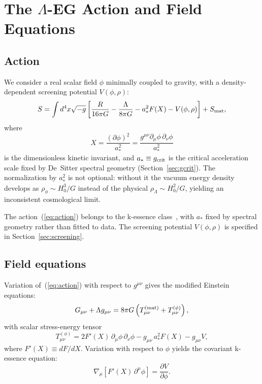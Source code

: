 \documentclass[11pt,a4paper]{article}
\begin{document}
\section{The \texorpdfstring{$\Lambda$}{Lambda}-EG Action and Field Equations}
\label{sec:action}

\subsection{Action}
\label{subsec:action}

We consider a real scalar field $\phi$ minimally coupled to gravity, with a
density-dependent screening potential $V(\phi,\rho)$:
\begin{equation}
  S = \int d^4x\sqrt{-g}\left[\frac{R}{16\pi G} - \frac{\Lambda}{8\pi G}
  - a_*^2 F(X) - V(\phi,\rho)\right] + S_{\rm mat},
  \label{eq:action}
\end{equation}
where
\begin{equation}
  X = \frac{(\partial\phi)^2}{a_*^2} = \frac{g^{\mu\nu}\partial_\mu\phi\,\partial_\nu\phi}{a_*^2}
\end{equation}
is the dimensionless kinetic invariant, and $a_* \equiv g_{\rm crit}$ is the critical
acceleration scale fixed by De~Sitter spectral geometry (Section~\ref{sec:gcrit}).
The normalization by $a_*^2$ is not optional: without it the vacuum energy density
develops as $\rho_\phi\sim H_0^3/G$ instead of the physical $\rho_\Lambda\sim H_0^2/G$,
yielding an inconsistent cosmological limit.

The action~(\ref{eq:action}) belongs to the k-essence class~\cite{ArmendarizPicon1999},
with $a_*$ fixed by spectral geometry rather than fitted to data. The screening potential
$V(\phi,\rho)$ is specified in Section~\ref{sec:screening}.

\subsection{Field equations}
\label{subsec:fieldeqs}

Variation of~(\ref{eq:action}) with respect to $g^{\mu\nu}$ gives the modified Einstein
equations:
\begin{equation}
  G_{\mu\nu} + \Lambda g_{\mu\nu}
  = 8\pi G\left(T_{\mu\nu}^{(\rm mat)} + T_{\mu\nu}^{(\phi)}\right),
  \label{eq:einstein}
\end{equation}
with scalar stress-energy tensor
\begin{equation}
  T_{\mu\nu}^{(\phi)}
  = 2F'(X)\,\partial_\mu\phi\,\partial_\nu\phi
  - g_{\mu\nu}\,a_*^2 F(X)
  - g_{\mu\nu} V,
  \label{eq:Tphi}
\end{equation}
where $F'(X)\equiv dF/dX$. Variation with respect to $\phi$ yields the covariant
k-essence equation:
\begin{equation}
  \nabla_\mu\!\left[F'(X)\,\partial^\mu\phi\right] = \frac{\partial V}{\partial\phi}.
  \label{eq:kessence}
\end{equation}
\end{document}

